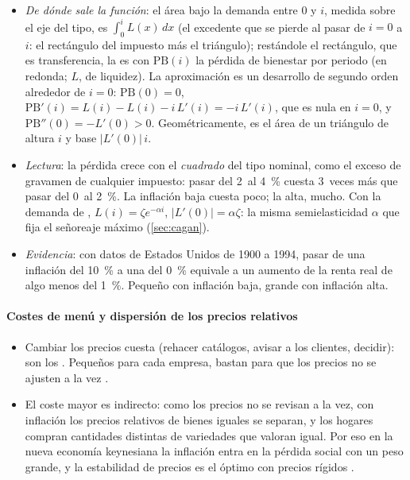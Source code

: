 \documentclass[11pt]{article}
\begin{document}
\begin{itemize}
\item \emph{De dónde sale la función}: el área bajo la demanda entre $0$ y $i$, medida sobre el eje del tipo, es $\int_0^{i}L(x)\,dx$ (el excedente que se pierde al pasar de $i=0$ a $i$: el rectángulo del impuesto más el triángulo); restándole el rectángulo, que es transferencia, la  es
  con $\mathrm{PB}(i)$ la pérdida de bienestar por periodo (en redonda; $L$, de liquidez). La aproximación es un desarrollo de segundo orden alrededor de $i=0$: $\mathrm{PB}(0)=0$, $\mathrm{PB}'(i)=L(i)-L(i)-i\,L'(i)=-i\,L'(i)$, que es nula en $i=0$, y $\mathrm{PB}''(0)=-L'(0)>0$. Geométricamente, es el área de un triángulo de altura $i$ y base $\lvert L'(0)\rvert\,i$.
\item \emph{Lectura}: la pérdida crece con el \emph{cuadrado} del tipo nominal, como el exceso de gravamen de cualquier impuesto: pasar del 2~al 4~\% cuesta 3~veces más que pasar del 0~al 2~\%. La inflación baja cuesta poco; la alta, mucho. Con la demanda de , $L(i)=\zeta e^{-\alpha i}$, $\lvert L'(0)\rvert=\alpha\zeta$: la misma semielasticidad $\alpha$ que fija el señoreaje máximo (\ref{sec:cagan}).
\item \emph{Evidencia}: con datos de Estados Unidos de 1900 a 1994, pasar de una inflación del 10~\% a una del 0~\% equivale a un aumento de la renta real de algo menos del 1~\%\nocite{Lucas2000Inflation}. Pequeño con inflación baja, grande con inflación alta.
\end{itemize}

\paragraph{Costes de menú y dispersión de los precios relativos}

\begin{itemize}
\item Cambiar los precios cuesta (rehacer catálogos, avisar a los clientes, decidir): son los . Pequeños para cada empresa, bastan para que los precios no se ajusten a la vez\nocite{Mankiw1985Small} .
\item El coste mayor es indirecto: como los precios no se revisan a la vez, con inflación los precios relativos de bienes iguales se separan, y los hogares compran cantidades distintas de variedades que valoran igual. Por eso en la nueva economía keynesiana la inflación entra en la pérdida social con un peso grande, y la estabilidad de precios es el óptimo con precios rígidos\nocite{Woodford2003Interest} .
\end{itemize}
\end{document}
